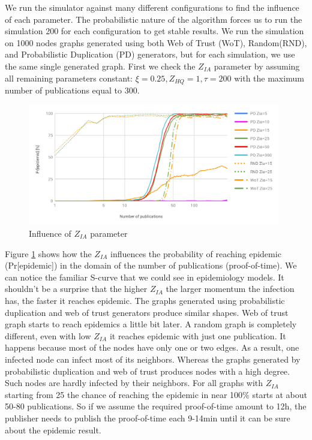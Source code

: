 \documentclass[nostrict]{szablonPG}
\begin{document}
We run the simulator against many different configurations to find the influence of each parameter. The probabilistic nature of the algorithm forces us to run the simulation 200 for each configuration to get stable results. We run the simulation on 1000 nodes graphs generated using both Web of Trust (WoT), Random(RND), and Probabilistic Duplication (PD) generators, but for each simulation, we use the same single generated graph. First we check the $Z_{IA}$ parameter by assuming all remaining parameters constant: $\xi=0.25, Z_{HQ} = 1, \tau=200$ with the maximum number of publications equal to 300.
\begin{figure}[h!]
    \includegraphics[width=11cm]{img/influence-of-zia.png}
    \centering
    \caption{Influence of $Z_{IA}$ parameter}
    \label{fig:influence-of-zia}
\end{figure} 
Figure \ref{fig:influence-of-zia} shows how the $Z_{IA}$ influences the probability of reaching epidemic (Pr[epidemic]) in the domain of the number of publications (proof-of-time). We can notice the familiar S-curve that we could see in epidemiology models. It shouldn't be a surprise that the higher $Z_{IA}$ the larger momentum the infection has, the faster it reaches epidemic. The graphs generated using probabilistic duplication and web of trust generators produce similar shapes. Web of trust graph starts to reach epidemics a little bit later. 
A random graph is completely different, even with low $Z_{IA}$ it reaches epidemic with just one publication. It happens because most of the nodes have only one or two edges. As a result, one infected node can infect most of its neighbors. Whereas the graphs generated by probabilistic duplication and web of trust produces nodes with a high degree. Such nodes are hardly infected by their neighbors.
For all graphs with $Z_{IA}$ starting from 25 the chance of reaching the epidemic in near 100\% starts at about 50-80 publications. So if we assume the required proof-of-time amount to 12h, the publisher needs to publish the proof-of-time each 9-14min until it can be sure about the epidemic result.
\end{document}
